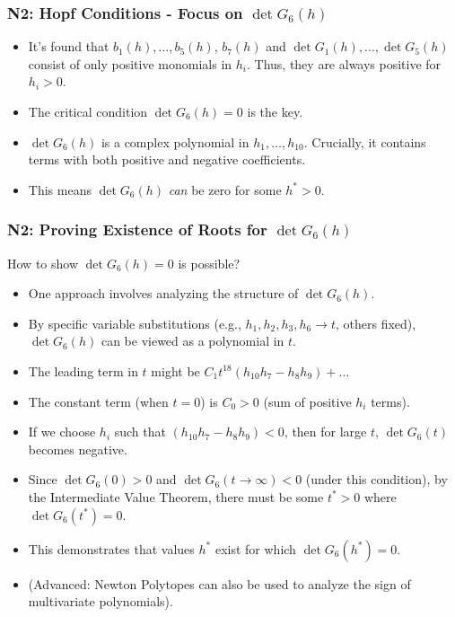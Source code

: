 \documentclass[aspectratio=169]{beamer}
\begin{document}
\begin{frame}{\insertsectionhead}
	\frametitle{N2: Hopf Conditions - Focus on $\det G_6(h)$}
	\begin{itemize}
		\item It's found that $b_1(h), \dots, b_5(h)$, $b_7(h)$ and $\det G_1(h), \dots, \det G_5(h)$ consist of \alert{only positive monomials} in $h_i$.
			Thus, they are always positive for $h_i > 0$.
		\item The critical condition $\det G_6(h) = 0$ is the key.
		\item $\det G_6(h)$ is a complex polynomial in $h_1, \dots, h_{10}$. Crucially, it contains terms with \alert{both positive and negative coefficients}.
		\item This means $\det G_6(h)$ \textit{can} be zero for some $h^* > 0$.
	\end{itemize}
\end{frame}

\begin{frame}{\insertsectionhead}
	\frametitle{N2: Proving Existence of Roots for $\det G_6(h)$}
	How to show $\det G_6(h)=0$ is possible?
	\begin{itemize}
		\item One approach involves analyzing the structure of $\det G_6(h)$.
		\item By specific variable substitutions (e.g., $h_1, h_2, h_3, h_6 \to t$, others fixed), $\det G_6(h)$ can be viewed as a polynomial in $t$.
		\item The leading term in $t$ might be $C_1 t^{18} (h_{10}h_7 - h_8h_9) + \dots$
		\item The constant term (when $t=0$) is $C_0 > 0$ (sum of positive $h_i$ terms).
		\item If we choose $h_i$ such that $(h_{10}h_7 - h_8h_9) < 0$, then for large $t$, $\det G_6(t)$ becomes negative.
		\item Since $\det G_6(0) > 0$ and $\det G_6(t \to \infty) < 0$ (under this condition), by the \alert{Intermediate Value Theorem}, there must be some $t^* > 0$ where $\det G_6(t^*) = 0$.
		\item This demonstrates that values $h^*$ exist for which $\det G_6(h^*) = 0$.
		\item (Advanced: Newton Polytopes can also be used to analyze the sign of multivariate polynomials).
	\end{itemize}
\end{frame}
\end{document}
